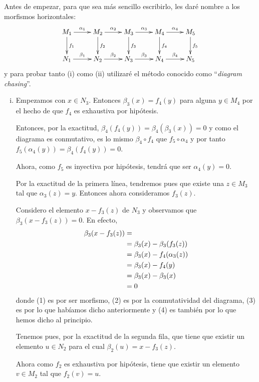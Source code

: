 \documentclass[../../../main.tex]{subfiles}
\begin{document}
\begin{sol}
Antes de empezar, para que sea más sencillo escribirlo, les daré nombre a los morfismos horizontales:
\begin{equation}
    \notag
    \xymatrix{
    M_1 \ar[d]^{f_1}\ar[r]^{\alpha_1} & M_2\ar[r]^{\alpha_2}\ar[d]^{f_2} & M_3 \ar[r]^{\alpha_3}\ar[d]^{f_3} & M_4\ar[r]^{\alpha_4}\ar[d]^{f_4} & M_5\ar[d]^{f_5} \\
    N_1\ar[r]^{\beta_1} & N_2\ar[r]^{\beta_2} & N_3\ar[r]^{\beta_3} & N_4\ar[r]^{\beta_4} & N_5
    }
\end{equation}
y para probar tanto (i) como (ii) utilizaré el método conocido como ``\textit{diagram chasing}''.
\begin{enumerate}[(i)]
    \item Empezamos con $x\in N_3$. Entonces $\beta_3(x) = f_4(y)$ para alguna $y\in M_4$ por el hecho de que $f_4$ es exhaustiva por hipótesis. 
    
    Entonces, por la exactitud, $\beta_4(f_4(y)) = \beta_4(\beta_3(x)) = 0$ y como el diagrama es conmutativo, es lo mismo $\beta_4\circ f_4$ que $f_5\circ\alpha_4$ y por tanto $f_5(\alpha_4(y)) = \beta_4(f_4(y)) = 0$. 
    
    Ahora, como $f_5$ es inyectiva por hipótesis, tendrá que ser $\alpha_4(y) = 0$.
    
    Por la exactitud de la primera línea, tendremos pues que existe una $z\in M_3$ tal que $\alpha_3(z) = y$. Entonces ahora consideramos $f_3(z)$.
    
    Considero el elemento $x-f_3(z)$ de $N_3$ y observamos que $\beta_3(x-f_3(z)) = 0$. En efecto,
    \begin{align}
        \notag
        \beta_3(x-f_3(z)) &= \\ &=\beta_3(x)-\beta_3(f_3(z)) \\&=\beta_3(x)-f_4(\alpha_3(z)) \\&= \beta_3(x)-f_4(y) \\&= \beta_3(x)-\beta_3(x) \\&= 0
    \end{align}
    donde (1) es por ser morfismo, (2) es por la conmutatividad del diagrama, (3) es por lo que habíamos dicho anteriormente y (4) es también por lo que hemos dicho al principio.
    
    Tenemos pues, por la exactitud de la segunda fila, que tiene que existir un elemento $u\in N_2$ para el cual $\beta_2(u) = x-f_3(z)$.
    
    Ahora como $f_2$ es exhaustiva por hipótesis, tiene que existir un elemento $v\in M_2$ tal que $f_2(v) = u$.
    

\end{enumerate}
\end{sol}
\end{document}

